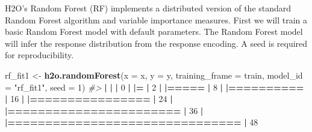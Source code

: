 \documentclass[]{book}
\newenvironment{Shaded}{\begin{snugshade}}{\end{snugshade}}
\newcommand{\CommentTok}[1]{\textcolor[rgb]{0.56,0.35,0.01}{\textit{#1}}}
\newcommand{\DataTypeTok}[1]{\textcolor[rgb]{0.13,0.29,0.53}{#1}}
\newcommand{\DecValTok}[1]{\textcolor[rgb]{0.00,0.00,0.81}{#1}}
\newcommand{\ErrorTok}[1]{\textcolor[rgb]{0.64,0.00,0.00}{\textbf{#1}}}
\newcommand{\KeywordTok}[1]{\textcolor[rgb]{0.13,0.29,0.53}{\textbf{#1}}}
\newcommand{\NormalTok}[1]{#1}
\newcommand{\OperatorTok}[1]{\textcolor[rgb]{0.81,0.36,0.00}{\textbf{#1}}}
\newcommand{\StringTok}[1]{\textcolor[rgb]{0.31,0.60,0.02}{#1}}
\begin{document}
H2O's Random Forest (RF) implements a distributed version of the standard
Random Forest algorithm and variable importance measures.
First we will train a basic Random Forest model with default parameters.
The Random Forest model will infer the response distribution from the response encoding.
A seed is required for reproducibility.

\begin{Shaded}
\begin{Highlighting}[]
\NormalTok{rf_fit1 <-}\StringTok{ }\KeywordTok{h2o.randomForest}\NormalTok{(}\DataTypeTok{x =}\NormalTok{ x,}
                            \DataTypeTok{y =}\NormalTok{ y,}
                            \DataTypeTok{training_frame =}\NormalTok{ train,}
                            \DataTypeTok{model_id =} \StringTok{"rf_fit1"}\NormalTok{,}
                            \DataTypeTok{seed =} \DecValTok{1}\NormalTok{)}
\CommentTok{#> }
  \OperatorTok{|}\StringTok{                                                                       }
\StringTok{  }\ErrorTok{|}\StringTok{                                                                 }\ErrorTok{|}\StringTok{   }\DecValTok{0}\NormalTok{%}
  \OperatorTok{|}\StringTok{                                                                       }
\StringTok{  }\ErrorTok{|=}\StringTok{                                                                }\ErrorTok{|}\StringTok{   }\DecValTok{2}\NormalTok{%}
  \OperatorTok{|}\StringTok{                                                                       }
\StringTok{  }\ErrorTok{|=====}\StringTok{                                                            }\ErrorTok{|}\StringTok{   }\DecValTok{8}\NormalTok{%}
  \OperatorTok{|}\StringTok{                                                                       }
\StringTok{  }\ErrorTok{|==========}\StringTok{                                                       }\ErrorTok{|}\StringTok{  }\DecValTok{16}\NormalTok{%}
  \OperatorTok{|}\StringTok{                                                                       }
\StringTok{  }\ErrorTok{|================}\StringTok{                                                 }\ErrorTok{|}\StringTok{  }\DecValTok{24}\NormalTok{%}
  \OperatorTok{|}\StringTok{                                                                       }
\StringTok{  }\ErrorTok{|=======================}\StringTok{                                          }\ErrorTok{|}\StringTok{  }\DecValTok{36}\NormalTok{%}
  \OperatorTok{|}\StringTok{                                                                       }
\StringTok{  }\ErrorTok{|===============================}\StringTok{                                  }\ErrorTok{|}\StringTok{  }\DecValTok{48}\NormalTok{%}
}}}}}}}
\end{Highlighting}
\end{Shaded}
\end{document}
